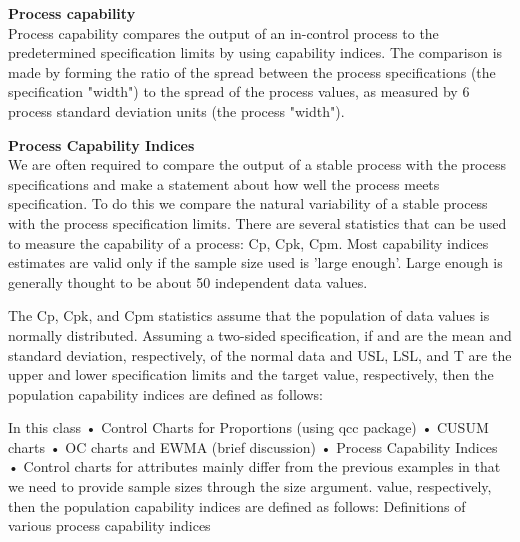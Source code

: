 \begin{frame}
\textbf{Process capability} \\
Process capability compares the output of an in-control process to the predetermined specification limits by using capability indices. The comparison is made by forming the ratio of the spread between the process specifications (the specification "width") to the spread of the process values, as measured by 6 process standard deviation units (the process "width"). 

\end{frame}
\begin{frame}

\textbf{Process Capability Indices}\\
We are often required to compare the output of a stable process with the process specifications and make a statement about how well the process meets specification. To do this we compare the natural variability of a stable process with the process specification limits.
There are several statistics that can be used to measure the capability of a process: Cp, Cpk, Cpm. 
Most capability indices estimates are valid only if the sample size used is 'large enough'. Large enough is generally thought to be about 50 independent data values. 
\end{frame}
\begin{frame}
The Cp, Cpk, and Cpm statistics assume that the population of data values is normally distributed. Assuming a two-sided specification, if  and  are the mean and standard deviation, respectively, of the normal data and USL, LSL, and T are the upper and lower specification limits and the target value, respectively, then the population capability indices are defined as follows:
\end{frame}
\begin{frame}
In this class
•	Control Charts for Proportions (using qcc package)
•	CUSUM charts
•	OC charts and EWMA (brief discussion)
•	Process Capability Indices
•	Control charts for attributes mainly differ from the previous examples in that we need to provide sample sizes through the size argument.
value, respectively, then the population capability indices are defined as follows: 
Definitions of various process capability indices 
\end{frame}
